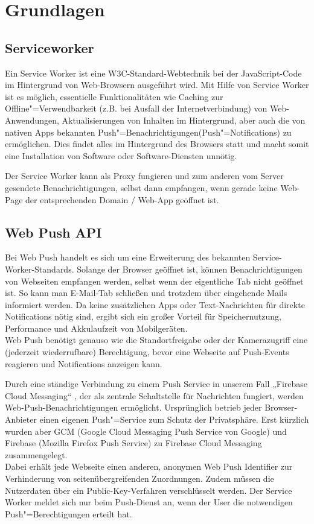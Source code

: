 \chapter{Grundlagen}

\section{Serviceworker}
\label{sec_grundladge_serviceworker}

Ein Service Worker ist eine W3C-Standard-Webtechnik bei der JavaScript-Code im Hintergrund von Web-Browsern ausgeführt wird. Mit Hilfe von Service Worker ist es möglich, essentielle Funktionalitäten wie Caching zur Offline"=Verwendbarkeit (z.B. bei Ausfall der Internetverbindung) von Web-Anwendungen, Aktualisierungen von Inhalten im Hintergrund, aber auch die von nativen Apps bekannten Push"=Benachrichtigungen(Push"=Notifications) zu ermöglichen. Dies findet alles im Hintergrund des Browsers statt und macht somit eine Installation von Software oder Software-Diensten unnötig.

Der Service Worker kann als Proxy fungieren und zum anderen vom Server gesendete Benachrichtigungen, selbst dann empfangen, wenn gerade keine Web-Page der entsprechenden Domain / Web-App geöffnet ist. 

\section{Web Push API}
\label{sec_grundlagen_web-push}
    
Bei Web Push handelt es sich um eine Erweiterung des bekannten Service-Worker-Standards. Solange der Browser geöffnet ist, können Benachrichtigungen von Webseiten empfangen werden, selbst wenn der eigentliche Tab nicht geöffnet ist. So kann man E-Mail-Tab schließen und trotzdem über eingehende Mails informiert werden. Da keine zusätzlichen Apps oder Text-Nachrichten für direkte Notifications nötig sind, ergibt sich ein großer Vorteil für Speichernutzung, Performance und Akkulaufzeit von Mobilgeräten. \\
Web Push benötigt genauso wie die Standortfreigabe oder der Kamerazugriff eine (jederzeit wiederrufbare) Berechtigung, bevor eine Webseite auf Push-Events reagieren und Notifications anzeigen kann. 

Durch eine ständige Verbindung zu einem Push Service in unserem Fall „Firebase Cloud Messaging“ , der als zentrale Schaltstelle für Nachrichten fungiert, werden Web-Push-Benachrichtigungen ermöglicht. Ursprünglich betrieb jeder Browser-Anbieter einen eigenen Push"=Service zum Schutz der Privatsphäre. Erst kürzlich wurden aber GCM (Google Cloud Messaging Push Service von Google) und Firebase (Mozilla Firefox Push Service) zu Firebase Cloud Messaging zusammengelegt. \\
Dabei erhält jede Webseite einen anderen, anonymen Web Push Identifier zur Verhinderung von seitenübergreifenden Zuordnungen. Zudem müssen die Nutzerdaten über ein Public-Key-Verfahren verschlüsselt werden. Der Service Worker meldet sich nur beim Push-Dienst an, wenn der User die notwendigen Push"=Berechtigungen erteilt hat. 